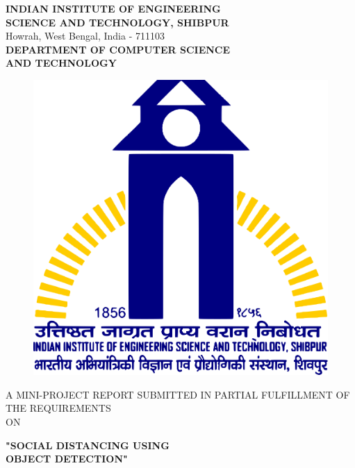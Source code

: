 \documentclass[a4paper]{article}
\begin{document}
\begin{titlepage}

    \begin{center}

        \textup{\large  \textbf{INDIAN INSTITUTE OF ENGINEERING}\\\textbf{SCIENCE AND TECHNOLOGY, SHIBPUR}}\\ Howrah, West Bengal, India - 711103\\[0.5cm]\textbf{\large DEPARTMENT OF COMPUTER SCIENCE}\\\textbf{\large AND TECHNOLOGY}

        \begin{center}
            \begin{figure}[h]   %
                \centering
                \includegraphics[width=0.3\linewidth]{Pictures/IIESTS Logo.png}
            \end{figure}
        \end{center}


        \textup{\large A MINI-PROJECT REPORT SUBMITTED IN PARTIAL FULFILLMENT OF THE REQUIREMENTS\\[0.4cm]ON}\\[0.4cm]

        \begin{LARGE}
            {\textbf {"SOCIAL DISTANCING USING \\[0.1cm]OBJECT DETECTION"}}
        \end{LARGE}\\[1cm]


\end{center}
\end{titlepage}
\end{document}
